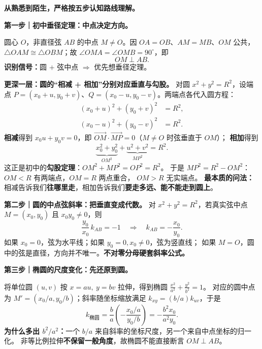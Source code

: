 \begin{explanationbox}

\textbf{从熟悉到陌生，严格按五步认知路线理解。}
\par\smallskip\noindent
\textbf{第一步｜初中垂径定理：中点决定方向。}
\begin{center}\end{center}
圆心 $O$，非直径弦 $AB$ 的中点 $M\ne O$。因 $OA=OB$、$AM=MB$、$OM$ 公共，
$\triangle OAM\cong\triangle OBM$；故 $\angle OMA=\angle OMB=90^\circ$，即
\[
\boxed{OM\perp AB}.
\]
\textbf{识别信号：}圆 $+$ 弦中点 $\Rightarrow$ 优先想垂径定理。
\par\smallskip\noindent
\textbf{更深一层：圆的``相减 + 相加''分别对应垂直与勾股。}
对圆 $x^2+y^2=R^2$，设端点
$P=(x_0+u,y_0+v)$、$Q=(x_0-u,y_0-v)$。两端点各代入圆方程：
\[
\begin{aligned}
(x_0+u)^2+(y_0+v)^2&=R^2,\\
(x_0-u)^2+(y_0-v)^2&=R^2.
\end{aligned}
\]
\textbf{相减}得到 $x_0u+y_0v=0$，即
$\overrightarrow{OM}\cdot\overrightarrow{MP}=0$（$M\ne O$ 时弦垂直于 $OM$）；
\textbf{相加}得到
\[
\underbrace{x_0^2+y_0^2}_{OM^2}
+\underbrace{u^2+v^2}_{MP^2}=R^2.
\]
这正是初中的\textbf{勾股定理}：$OM^2+MP^2=OP^2=R^2$。
于是 $MP^2=R^2-OM^2$：$OM<R$ 有两端点，$OM=R$ 两点重合，
$OM>R$ 无实端点。
\textbf{最本质的问法：}相减告诉我们\textbf{往哪里走}，相加告诉我们\textbf{要走多远、能不能走到圆上}。
\par\medskip\noindent
\textbf{第二步｜圆的中点弦斜率：把垂直变成代数。}
对 $x^2+y^2=R^2$，若真实弦中点 $M=(x_0,y_0)$ 且 $x_0y_0\ne0$，则
\[
\frac{y_0}{x_0}\,k_{AB}=-1\quad\Longrightarrow\quad
\boxed{k_{AB}=-\frac{x_0}{y_0}}.
\]
如果 $x_0=0$，弦为水平线；如果 $y_0=0,x_0\ne0$，弦为竖直线；
如果 $M=O$，圆中的弦是直径，方向并不唯一。\textbf{不对零分母硬套斜率公式。}
\par\medskip\noindent
\textbf{第三步｜椭圆的尺度变化：先还原到圆。}
\begin{center}\end{center}
将单位圆 $(u,v)$ 按 $x=au,\ y=bv$ 拉伸，得到椭圆
$\frac{x^2}{a^2}+\frac{y^2}{b^2}=1$。
对应的圆中点为 $M'=(x_0/a,y_0/b)$；斜率随坐标缩放满足
$k_{xy}=(b/a)k_{uv}$，于是
\[
\boxed{k_{\text{椭圆}}=\frac ba\left(-\frac{x_0/a}{y_0/b}\right)
=-\frac{b^2x_0}{a^2y_0}}.
\]
\textbf{为什么多出 $b^2/a^2$：}一个 $b/a$ 来自斜率的坐标尺度，另一个来自中点坐标的归一化。
非等比例拉伸\textbf{不保留一般角度}，故椭圆不能直接断言 $OM\perp AB$。
\par\medskip\noindent

\end{explanationbox}
